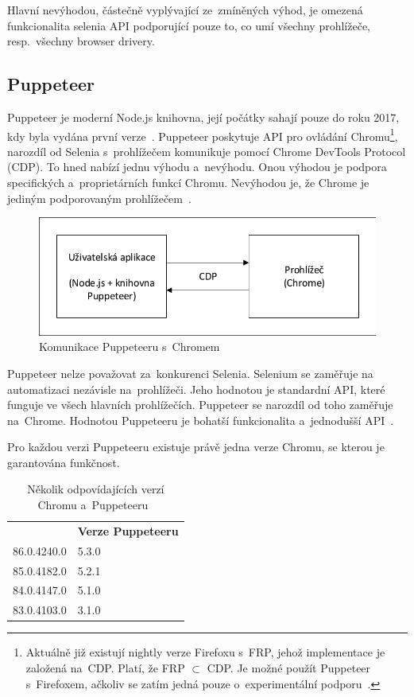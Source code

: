 \documentclass[12pt, a4paper, twoside]{article}
\begin{document}
	Hlavní nevýhodou, částečně vyplývající ze~zmíněných výhod, je omezená funkcionalita selenia API podporující pouze to, co umí všechny prohlížeče, resp.~všechny browser drivery.
	\subsection{Puppeteer}
	\label{sub_sec:Puppeteer}
	Puppeteer je moderní Node.js knihovna, její počátky sahají pouze do roku 2017, kdy byla vydána první verze~\cite{puppeteerFirstRelease}. Puppeteer poskytuje API pro ovládání Chromu\footnote{Aktuálně již existují nightly verze Firefoxu s~FRP, jehož implementace je založená na~CDP. Platí, že FRP $\subset$ CDP. Je možné použít Puppeteer s~Firefoxem, ačkoliv se zatím jedná pouze o~experimentální podporu~\cite{firefoxRemoteProtocol, firefoxRemoteProtocol2}.}, narozdíl od Selenia s~prohlížečem komunikuje pomocí Chrome DevTools Protocol (CDP). To hned nabízí jednu výhodu a~nevýhodu. Onou výhodou je podpora specifických a~proprietárních funkcí Chromu. Nevýhodou je, že Chrome je jediným podporovaným prohlížečem~\cite{puppeteerMainPage}.
	\begin{figure}[H]
		\centering	
		\includegraphics[width=1.0\textwidth]{puppeteerCom.pdf}
		\caption{Komunikace Puppeteeru s~Chromem}
	\end{figure}

	Puppeteer nelze považovat za~konkurenci Selenia. Selenium se zaměřuje na~ automatizaci nezávisle na~prohlížeči. Jeho hodnotou je standardní API, které funguje ve všech hlavních prohlížečích. Puppeteer se narozdíl od toho zaměřuje na~Chrome. Hodnotou Puppeteeru je bohatší funkcionalita a~jednodušší API~\cite{puppeteerMainPage}. 
	
	Pro každou verzi Puppeteeru existuje právě jedna verze Chromu, se kterou je garantována funkčnost. 
	\begin{table}[H]
		\centering
		\begin{tabular}{ l|l } 
			\rowcolor{tableHeadingBackground}
			\multicolumn{1}{l}{\textbf{Verze Chromu}} & \multicolumn{1}{l}{\textbf{Verze Puppeteeru}} \\
			86.0.4240.0 & 5.3.0 \\ 
			85.0.4182.0 & 5.2.1 \\
			84.0.4147.0 & 5.1.0 \\
			83.0.4103.0 & 3.1.0
		\end{tabular}
		\caption{Několik odpovídajících verzí Chromu a~Puppeteeru~\cite{puppeteerApi}}
	\end{table}
\end{document}
